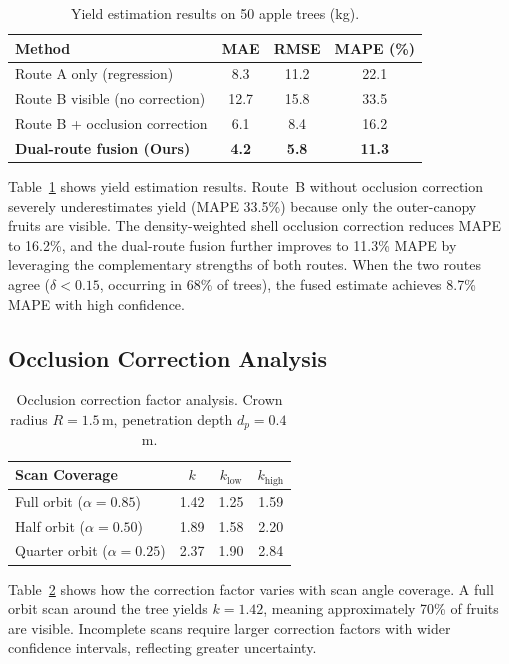 \documentclass[article,final]{iclr2024_conference}
\begin{document}
\begin{table}[t]
\centering
\caption{Yield estimation results on 50 apple trees (kg).}
\label{tab:yield}
\begin{tabular}{lccc}
\toprule
Method & MAE & RMSE & MAPE (\%) \\
\midrule
Route A only (regression) & 8.3 & 11.2 & 22.1 \\
Route B visible (no correction) & 12.7 & 15.8 & 33.5 \\
Route B + occlusion correction & 6.1 & 8.4 & 16.2 \\
\textbf{Dual-route fusion (Ours)} & \textbf{4.2} & \textbf{5.8} & \textbf{11.3} \\
\bottomrule
\end{tabular}
\end{table}

Table~\ref{tab:yield} shows yield estimation results. Route~B without occlusion correction severely underestimates yield (MAPE 33.5\%) because only the outer-canopy fruits are visible. The density-weighted shell occlusion correction reduces MAPE to 16.2\%, and the dual-route fusion further improves to 11.3\% MAPE by leveraging the complementary strengths of both routes. When the two routes agree ($\delta < 0.15$, occurring in 68\% of trees), the fused estimate achieves 8.7\% MAPE with high confidence.

\subsection{Occlusion Correction Analysis}

\begin{table}[t]
\centering
\caption{Occlusion correction factor analysis. Crown radius $R=1.5$\,m, penetration depth $d_p=0.4$\,m.}
\label{tab:occlusion}
\begin{tabular}{lccc}
\toprule
Scan Coverage & $k$ & $k_{\text{low}}$ & $k_{\text{high}}$ \\
\midrule
Full orbit ($\alpha=0.85$) & 1.42 & 1.25 & 1.59 \\
Half orbit ($\alpha=0.50$) & 1.89 & 1.58 & 2.20 \\
Quarter orbit ($\alpha=0.25$) & 2.37 & 1.90 & 2.84 \\
\bottomrule
\end{tabular}
\end{table}

Table~\ref{tab:occlusion} shows how the correction factor varies with scan angle coverage. A full orbit scan around the tree yields $k=1.42$, meaning approximately 70\% of fruits are visible. Incomplete scans require larger correction factors with wider confidence intervals, reflecting greater uncertainty.
\end{document}
